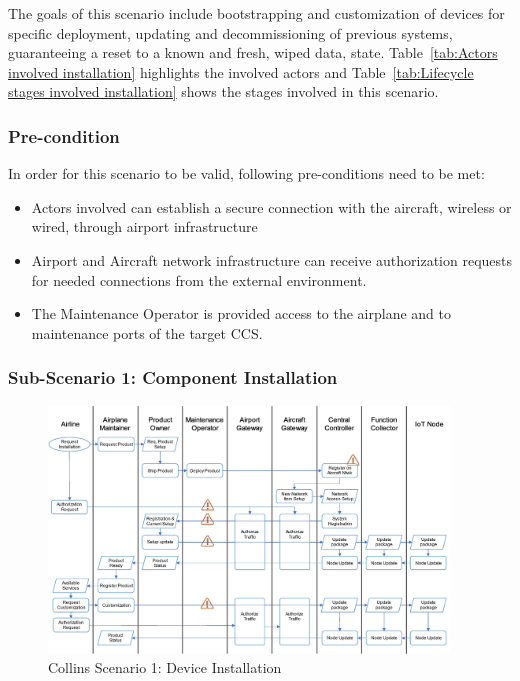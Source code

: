The goals of this scenario include bootstrapping and customization of devices for specific deployment, updating and
decommissioning of previous systems, guaranteeing a reset to a known and fresh, wiped data, state.
Table~\ref{tab:Actors involved installation} highlights the involved actors and
Table~\ref{tab:Lifecycle stages involved installation} shows the stages involved in this scenario.

\subsubsection{Pre-condition}

In order for this scenario to be valid, following pre-conditions need to be met:
\begin{itemize}
	\item Actors involved can establish a secure connection with the aircraft, wireless or wired, through airport
	      infrastructure
	\item Airport and Aircraft network infrastructure can receive authorization requests for needed connections from
	      the external environment.
	\item The Maintenance Operator is provided access to the airplane and to maintenance ports of the target CCS.

\end{itemize}

\subsubsection{Sub-Scenario 1: Component Installation}

\begin{figure}
	\begin{center}
		\includegraphics[width=0.95\textwidth]{figures/collins-s1-installation.jpg}
	\end{center}
	\caption{Collins Scenario 1: Device Installation}
	\label{fig:collins-s1-installation}
\end{figure}

